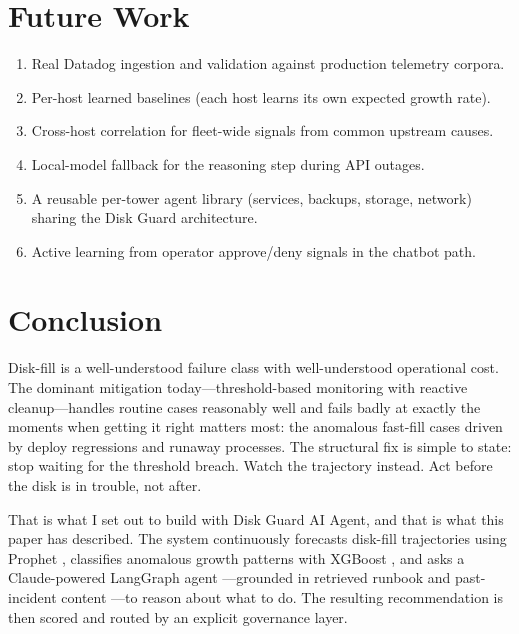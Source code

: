 \documentclass[conference]{IEEEtran}
\begin{document}
\section{Future Work}
\label{sec:future}

\begin{enumerate}
\item Real Datadog ingestion and validation against production
  telemetry corpora.
\item Per-host learned baselines (each host learns its own expected
  growth rate).
\item Cross-host correlation for fleet-wide signals from common
  upstream causes.
\item Local-model fallback for the reasoning step during API outages.
\item A reusable per-tower agent library (services, backups, storage,
  network) sharing the Disk Guard architecture.
\item Active learning from operator approve/deny signals in the
  chatbot path.
\end{enumerate}

\section{Conclusion}
\label{sec:conclusion}

Disk-fill is a well-understood failure class with well-understood
operational cost. The dominant mitigation today---threshold-based
monitoring with reactive cleanup---handles routine cases reasonably
well and fails badly at exactly the moments when getting it right
matters most: the anomalous fast-fill cases driven by deploy
regressions and runaway processes. The structural fix is simple to
state: stop waiting for the threshold breach. Watch the trajectory
instead. Act before the disk is in trouble, not after.

That is what I set out to build with Disk Guard AI Agent, and that
is what this paper has described. The system continuously forecasts
disk-fill trajectories using Prophet \cite{taylor2018forecasting},
classifies anomalous growth patterns with XGBoost
\cite{chen2016xgboost}, and asks a Claude-powered LangGraph agent
\cite{anthropic2024claude3,langchain2024langgraph}---grounded in
retrieved runbook and past-incident content \cite{lewis2020rag}---to
reason about what to do. The resulting recommendation is then scored
and routed by an explicit governance layer.
\end{document}
